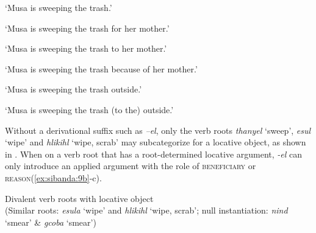 \documentclass[output=paper]{langsci/langscibook}
\begin{document}
\glt ‘Musa is sweeping the trash.’


\glt ‘Musa is sweeping the trash for her mother.’


\glt ‘Musa is sweeping the trash to her mother.’


\glt ‘Musa is sweeping the trash because of her mother.’


\glt ‘Musa is sweeping the trash outside.’


\glt ‘Musa is sweeping the trash (to the) outside.’
\z
\z

Without a derivational suffix such as \textit{–el}, only the verb roots \textit{thanyel} ‘sweep’, \textit{esul} ‘wipe’ and \textit{hlikihl} ‘wipe, scrab’ may subcategorize for a locative object, as shown in . When on a verb root that has a root-determined locative argument, \textit{-el} can only introduce an applied argument with the role of \textsc{beneficiary} or \textsc{reason}(\ref{ex:sibanda:9b}-c). 

\ea\label{ex:sibanda:9}
\settowidth{}
{Divalent verb roots with locative object} \\
 (Similar roots: \textit{esula} ‘wipe’ and \textit{hlikihl} ‘wipe, scrab’; null instantiation: \textit{nind} ‘smear’ \& \textit{gcoba} ‘smear’)\\
\end{document}
